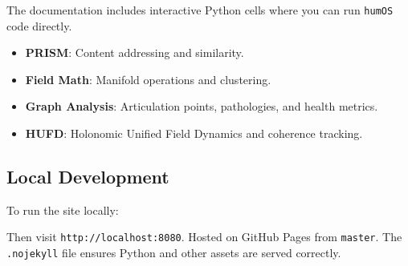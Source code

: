 \documentclass[12pt,a4paper]{article}
\providecommand{\tightlist}{\setlength{\itemsep}{0pt}\setlength{\parskip}{0pt}}
\begin{document}
The documentation includes interactive Python cells where you can run
\texttt{humOS} code directly.

\begin{itemize}
\tightlist
\item
  \textbf{PRISM}: Content addressing and similarity.
\item
  \textbf{Field Math}: Manifold operations and clustering.
\item
  \textbf{Graph Analysis}: Articulation points, pathologies, and health
  metrics.
\item
  \textbf{HUFD}: Holonomic Unified Field Dynamics and coherence
  tracking.
\end{itemize}

\subsection{Local Development}\label{local-development}

To run the site locally:

\begin{Shaded}
\begin{Highlighting}[]
 
\end{Highlighting}
\end{Shaded}

Then visit \texttt{http://localhost:8080}. Hosted on GitHub Pages from
\texttt{master}. The \texttt{.nojekyll} file ensures Python and other
assets are served correctly.
\end{document}
